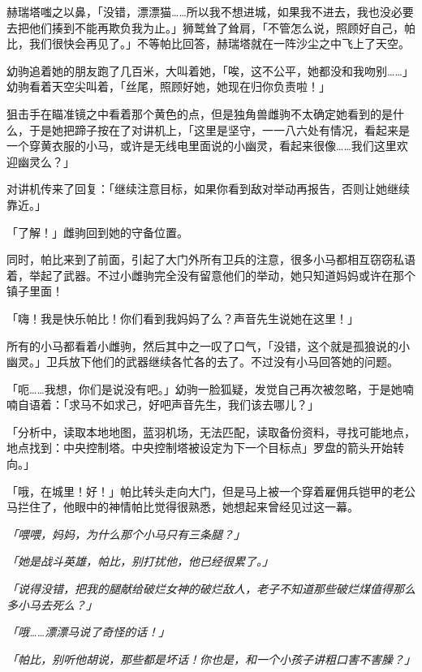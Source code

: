 赫瑞塔嗤之以鼻，「没错，漂漂猫……所以我不想进城，如果我不进去，我也没必要去把他们揍到不能再欺负我为止。」狮鹫耸了耸肩，「不管怎么说，照顾好自己，帕比，我们很快会再见了。」不等帕比回答，赫瑞塔就在一阵沙尘之中飞上了天空。

幼驹追着她的朋友跑了几百米，大叫着她，「唉，这不公平，她都没和我吻别……」幼驹看着天空尖叫着，「丝尾，照顾好她，她现在归你负责啦！」

\horizonline


狙击手在瞄准镜之中看着那个黄色的点，但是独角兽雌驹不太确定她看到的是什么，于是她把蹄子按在了对讲机上，「这里是坚守，一一八六处有情况，看起来是一个穿黄衣服的小马，或许是无线电里面说的小幽灵，看起来很像……我们这里欢迎幽灵么？」

对讲机传来了回复：「继续注意目标，如果你看到敌对举动再报告，否则让她继续靠近。」

「了解！」雌驹回到她的守备位置。

同时，帕比来到了前面，引起了大门外所有卫兵的注意，很多小马都相互窃窃私语着，举起了武器。不过小雌驹完全没有留意他们的举动，她只知道妈妈或许在那个镇子里面！

「嗨！我是快乐帕比！你们看到我妈妈了么？声音先生说她在这里！」

所有的小马都看着小雌驹，然后其中之一叹了口气，「没错，这个就是孤狼说的小幽灵。」卫兵放下他们的武器继续各忙各的去了。不过没有小马回答她的问题。

「呃……我想，你们是说没有吧。」幼驹一脸狐疑，发觉自己再次被忽略，于是她喃喃自语着：「求马不如求己，好吧声音先生，我们该去哪儿？」

「{\mt 分析中，读取本地地图，蓝羽机场，无法匹配，读取备份资料，寻找可能地点，地点找到：中央控制塔。中央控制塔被设定为下一个目标点」罗盘的箭头开始转向。}」

「哦，在城里！好！」帕比转头走向大门，但是马上被一个穿着雇佣兵铠甲的老公马拦住了，他眼中的神情帕比觉得很熟悉，她想起来曾经见过这一幕。

\emph{「喂喂，妈妈，为什么那个小马只有三条腿？」}

\emph{「她是战斗英雄，帕比，别打扰他，他已经很累了。」}

\emph{「说得没错，把我的腿献给破烂女神的破烂敌人，老子不知道那些破烂煤值得那么多小马去死么？」}

\emph{「哦……漂漂马说了奇怪的话！」}

\emph{「帕比，别听他胡说，那些都是坏话！你也是，和一个小孩子讲粗口害不害臊？」}

